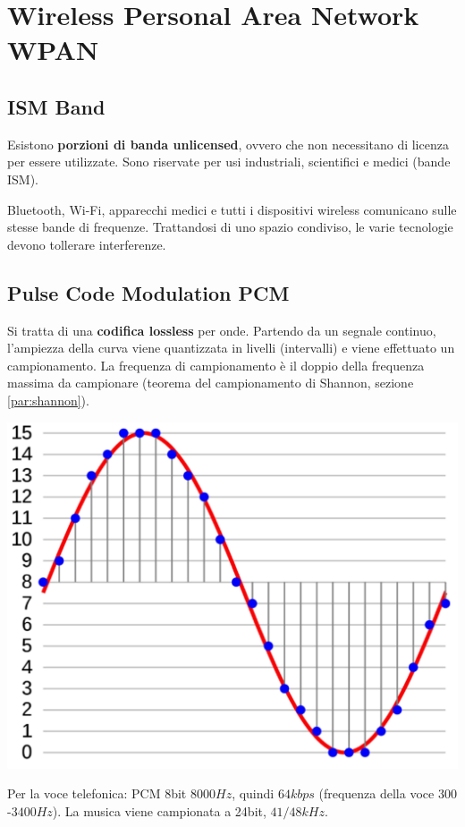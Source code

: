 \section{Wireless Personal Area Network WPAN}

\subsection{ISM Band}

Esistono \textbf{porzioni di banda unlicensed}, ovvero che non necessitano di licenza per essere utilizzate. Sono riservate per usi industriali, scientifici e medici (bande ISM).

Bluetooth, Wi-Fi, apparecchi medici e tutti i dispositivi wireless comunicano sulle stesse bande di frequenze. Trattandosi di uno spazio condiviso, le varie tecnologie devono tollerare interferenze.

\subsection{Pulse Code Modulation PCM}

Si tratta di una \textbf{codifica lossless} per onde. Partendo da un segnale continuo, l'ampiezza della curva viene quantizzata in livelli (intervalli) e viene effettuato un campionamento. La frequenza di campionamento è il doppio della frequenza massima da campionare (teorema del campionamento di Shannon, sezione \ref{par:shannon}).

\begin{center}
	\includegraphics[width=0.7\linewidth]{img/wpan/PCM}
\end{center}

Per la voce telefonica: PCM 8bit $8000Hz$, quindi $64kbps$ (frequenza della voce $300$-$3400Hz$). La musica viene campionata a 24bit, $41/48kHz$.

